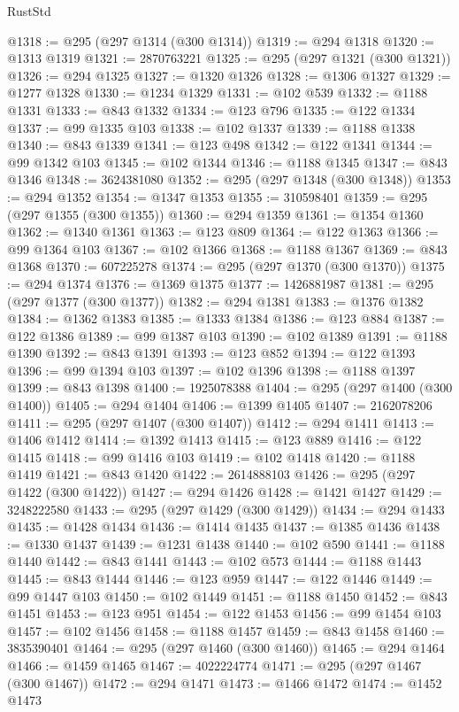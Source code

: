 \begin{lexlean}{RustStd}
\begin{coremodule}
{\begin{coremodule}
{{{{{{{{{{{{{{{{{{{{{{{{{{{{{{{{{@1318 := @295 (@297 @1314 (@300 @1314))
@1319 := @294 @1318
@1320 := @1313 @1319
@1321 := 2870763221
@1325 := @295 (@297 @1321 (@300 @1321))
@1326 := @294 @1325
@1327 := @1320 @1326
@1328 := @1306 @1327
@1329 := @1277 @1328
@1330 := @1234 @1329
@1331 := @102 @539
@1332 := @1188 @1331
@1333 := @843 @1332
@1334 := @123 @796
@1335 := @122 @1334
@1337 := @99 @1335 @103
@1338 := @102 @1337
@1339 := @1188 @1338
@1340 := @843 @1339
@1341 := @123 @498
@1342 := @122 @1341
@1344 := @99 @1342 @103
@1345 := @102 @1344
@1346 := @1188 @1345
@1347 := @843 @1346
@1348 := 3624381080
@1352 := @295 (@297 @1348 (@300 @1348))
@1353 := @294 @1352
@1354 := @1347 @1353
@1355 := 310598401
@1359 := @295 (@297 @1355 (@300 @1355))
@1360 := @294 @1359
@1361 := @1354 @1360
@1362 := @1340 @1361
@1363 := @123 @809
@1364 := @122 @1363
@1366 := @99 @1364 @103
@1367 := @102 @1366
@1368 := @1188 @1367
@1369 := @843 @1368
@1370 := 607225278
@1374 := @295 (@297 @1370 (@300 @1370))
@1375 := @294 @1374
@1376 := @1369 @1375
@1377 := 1426881987
@1381 := @295 (@297 @1377 (@300 @1377))
@1382 := @294 @1381
@1383 := @1376 @1382
@1384 := @1362 @1383
@1385 := @1333 @1384
@1386 := @123 @884
@1387 := @122 @1386
@1389 := @99 @1387 @103
@1390 := @102 @1389
@1391 := @1188 @1390
@1392 := @843 @1391
@1393 := @123 @852
@1394 := @122 @1393
@1396 := @99 @1394 @103
@1397 := @102 @1396
@1398 := @1188 @1397
@1399 := @843 @1398
@1400 := 1925078388
@1404 := @295 (@297 @1400 (@300 @1400))
@1405 := @294 @1404
@1406 := @1399 @1405
@1407 := 2162078206
@1411 := @295 (@297 @1407 (@300 @1407))
@1412 := @294 @1411
@1413 := @1406 @1412
@1414 := @1392 @1413
@1415 := @123 @889
@1416 := @122 @1415
@1418 := @99 @1416 @103
@1419 := @102 @1418
@1420 := @1188 @1419
@1421 := @843 @1420
@1422 := 2614888103
@1426 := @295 (@297 @1422 (@300 @1422))
@1427 := @294 @1426
@1428 := @1421 @1427
@1429 := 3248222580
@1433 := @295 (@297 @1429 (@300 @1429))
@1434 := @294 @1433
@1435 := @1428 @1434
@1436 := @1414 @1435
@1437 := @1385 @1436
@1438 := @1330 @1437
@1439 := @1231 @1438
@1440 := @102 @590
@1441 := @1188 @1440
@1442 := @843 @1441
@1443 := @102 @573
@1444 := @1188 @1443
@1445 := @843 @1444
@1446 := @123 @959
@1447 := @122 @1446
@1449 := @99 @1447 @103
@1450 := @102 @1449
@1451 := @1188 @1450
@1452 := @843 @1451
@1453 := @123 @951
@1454 := @122 @1453
@1456 := @99 @1454 @103
@1457 := @102 @1456
@1458 := @1188 @1457
@1459 := @843 @1458
@1460 := 3835390401
@1464 := @295 (@297 @1460 (@300 @1460))
@1465 := @294 @1464
@1466 := @1459 @1465
@1467 := 4022224774
@1471 := @295 (@297 @1467 (@300 @1467))
@1472 := @294 @1471
@1473 := @1466 @1472
@1474 := @1452 @1473
}}}}}}}}}}}}}}}}}}}}}}}}}}}}}}}}}
\end{coremodule}}
\end{coremodule}
\end{lexlean}
